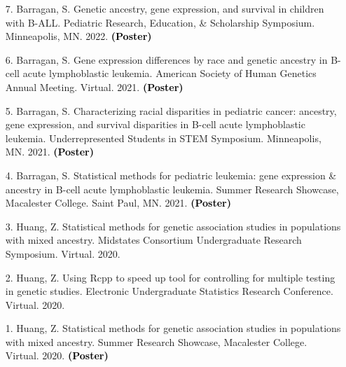 \documentclass[margin]{res}
\newcommand{\annotate}[1]{\textcolor{black}{\textbf{(#1)}}}
\begin{document}
\begin{resume}
\begin{itemize}

\item[7.] Barragan, S.  
Genetic ancestry, gene expression, and survival in children with B-ALL. 
Pediatric Research, Education, \& Scholarship Symposium. Minneapolis, MN. 2022. 
\annotate{Poster}


\item[6.] Barragan, S.  
Gene expression differences by race and genetic ancestry in B-cell acute lymphoblastic leukemia. 
American Society of Human Genetics Annual Meeting. Virtual. 2021. 
\annotate{Poster}

\item[5.] Barragan, S.  
Characterizing racial disparities in pediatric cancer: ancestry, gene expression, and survival disparities in B-cell acute lymphoblastic leukemia. 
Underrepresented Students in STEM Symposium. Minneapolis, MN. 2021. 
\annotate{Poster}

\item[4.] Barragan, S.  
Statistical methods for pediatric leukemia: gene expression \& ancestry in B-cell acute lymphoblastic leukemia. 
Summer Research Showcase, Macalester College. Saint Paul, MN. 2021. 
\annotate{Poster}


\item[3.] Huang, Z. 
Statistical methods for genetic association studies in populations with mixed ancestry. 
Midstates Consortium Undergraduate Research Symposium. Virtual. 2020.

\item[2.] Huang, Z. 
Using Rcpp to speed up tool for controlling for multiple testing in genetic studies. 
Electronic Undergraduate Statistics Research Conference. Virtual. 2020.

\item[1.] Huang, Z. 
Statistical methods for genetic association studies in populations with mixed ancestry. 
Summer Research Showcase, Macalester College. Virtual. 2020. 
\annotate{Poster} \\


\end{itemize}
\end{resume}
\end{document}
